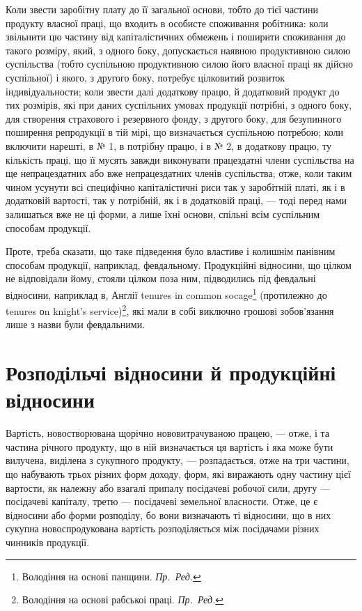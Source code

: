 
Коли звести заробітну плату до її загальної основи, тобто до тієї частини
продукту власної праці, що входить в особисте споживання робітника: коли
звільнити цю частину від капіталістичних обмежень і поширити споживання до
такого розміру, який, з одного боку, допускається наявною продуктивною силою
суспільства (тобто суспільною продуктивною силою його власної праці як дійсно
суспільної) і якого, з другого боку, потребує цілковитий розвиток індивідуальности; коли звести далі
додаткову працю, й додатковий продукт до тих розмірів,
які при даних суспільних умовах продукції потрібні, з одного боку, для створення
страхового і резервного фонду, з другого боку, для безупинного поширення
репродукції в тій мірі, що визначається суспільною потребою; коли включити
нарешті, в № 1, в потрібну працю, і в № 2, в додаткову працю, ту кількість
праці, що її мусять завжди виконувати працездатні члени суспільства на ще
непрацездатних або вже непрацездатних членів суспільства; отже, коли таким
чином усунути всі специфічно капіталістичні риси так у заробітній платі, як і в
додатковій вартості, так у потрібній, як і в додатковій праці, — тоді перед
нами залишаться вже не ці форми, а лише їхні основи, спільні всім суспільним
способам продукції.

Проте, треба сказати, що таке підведення було властиве і колишнім панівним
способам продукції, наприклад, февдальному. Продукційні відносини, що
цілком не відповідали йому, стояли цілком поза ним, підводились під февдальні
відносини, наприклад в, Англії tenures in common socage\footnote*{
Володіння на основі панщини. \emph{Пр.~Ред.}
} (протилежно до tenures
оn knight’s service)\footnote*{
Володіння на основі рабськоі праці. \emph{Пр.~Ред.}
}, які мали в собі виключно грошові зобов’язання
лише з назви були февдальними.

\section{Розподільчі відносини й продукційні відносини}

Вартість, новостворювана щорічно нововитрачуваною працею, — отже, і та
частина річного продукту, що в ній визначається ця вартість і яка може бути
вилучена, виділена з сукупного продукту, — розпадається, отже на три частини,
що набувають трьох різних форм доходу, форм, які виражають одну частину
цієї вартости, як належну або взагалі припалу посідачеві робочої
сили, другу — посідачеві капіталу, третю — посідачеві земельної власности.
Отже, це є відносини або форми розподілу, бо вони визначають ті відносини,
що в них сукупна новоспродукована вартість розподіляється між посідачами
різних чинників продукції.

